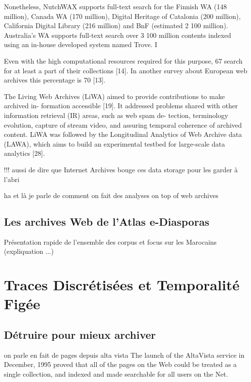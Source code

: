 \documentclass[symmetric,justified,marginals=raggedouter]{tufte-book}
\begin{document}
Nonetheless, NutchWAX
supports full-text search for the Finnish WA (148 million), Canada WA (170 million),
Digital Heritage of Catalonia (200 million), California Digital Library (216 million)
and BnF (estimated 2 100 million). Australia’s WA supports full-text search over 3 100
million contents indexed using an in-house developed system named Trove. I

Even with
the high computational resources required for this purpose,
67%
search for at least a part of their collections [14].  In another
survey about European web archives this percentage is 70%
[13].

  The Living Web Archives
(LiWA) aimed to provide contributions to make archived in-
formation accessible [19].  It addressed problems shared with
other information retrieval (IR) areas, such as web spam de-
tection, terminology evolution, capture of stream video, and
assuring temporal coherence of archived content.  LiWA was
followed by the Longitudinal Analytics of Web Archive data
(LAWA), which aims to build an experimental testbed for large-scale data analytics [28].

!!! aussi de dire que Internet Archives bouge ces data storage pour les garder à l'abri

ha et là je parle de comment on fait des analyses on top of web archives

\section{Les archives Web de l'Atlas e-Diasporas}

Présentation rapide de l'ensemble des corpus et focus sur les Marocains (expliquation ...)


\chapter{Traces Discrétisées et Temporalité Figée} 
\label{chap:4}

\section{Détruire pour mieux archiver}
\label{sec:4_derrida}

on parle en fait de pages depuis alta vista The launch of the AltaVista service in December, 1995 proved that all
of the pages on the Web could be treated as a single collection, and
indexed and made searchable for all users on the Net.
\end{document}
